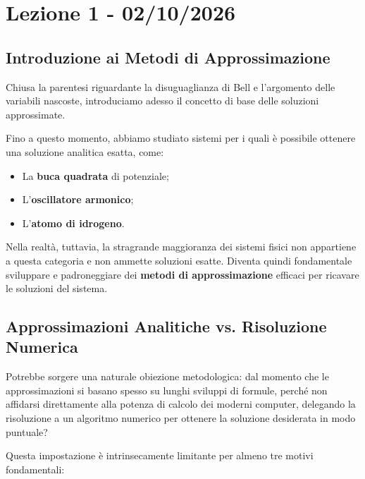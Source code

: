 \chapter{Lezione 1 - 02/10/2026}

\section{Introduzione ai Metodi di Approssimazione}

Chiusa la parentesi riguardante la disuguaglianza di Bell e l'argomento delle variabili nascoste, introduciamo adesso il concetto di base delle soluzioni approssimate.

Fino a questo momento, abbiamo studiato sistemi per i quali è possibile ottenere una soluzione analitica esatta, come:
\begin{itemize}
\item La \textbf{buca quadrata} di potenziale;
\item L'\textbf{oscillatore armonico};
\item L'\textbf{atomo di idrogeno}.
\end{itemize}

Nella realtà, tuttavia, la stragrande maggioranza dei sistemi fisici non appartiene a questa categoria e non ammette soluzioni esatte. Diventa quindi fondamentale sviluppare e padroneggiare dei \textbf{metodi di approssimazione} efficaci per ricavare le soluzioni del sistema.

\section{Approssimazioni Analitiche vs. Risoluzione Numerica}

Potrebbe sorgere una naturale obiezione metodologica: dal momento che le approssimazioni si basano spesso su lunghi sviluppi di formule, perché non affidarsi direttamente alla potenza di calcolo dei moderni computer, delegando la risoluzione a un algoritmo numerico per ottenere la soluzione desiderata in modo puntuale?

Questa impostazione è intrinsecamente limitante per almeno tre motivi fondamentali:

